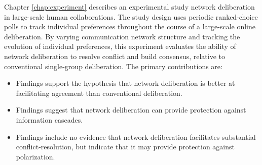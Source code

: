 Chapter \ref{chap:experiment} describes an experimental study network deliberation in large-scale human collaborations.
The study design uses periodic ranked-choice polls to track individual preferences
throughout the course of a large-scale online deliberation.
By varying communication network structure and tracking the evolution of individual
preferences,
this experiment evaluates the ability of network deliberation to resolve conflict
and build consensus, relative to conventional single-group deliberation.
The primary contributions are:
\begin{itemize}
\setlength\itemsep{0pt}
    \item Findings support the hypothesis that network deliberation is better at facilitating agreement than conventional deliberation.
    \item Findings suggest that network deliberation can provide protection against information cascades.
    \item Findings include no evidence that network deliberation facilitates substantial conflict-resolution, but indicate that it may provide protection against polarization.
\end{itemize}

